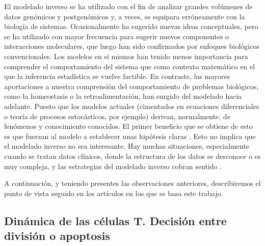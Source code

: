 El modelado inverso se ha utilizado con el fin de analizar grandes volúmenes de datos genómicos y postgenómicos y, a veces, se equipara erróneamente con la biología de sistemas. Ocasionalmente ha sugerido nuevas ideas conceptuales, pero se ha utilizado con mayor frecuencia para sugerir nuevos componentes o interacciones moleculares, que luego han sido confirmados por enfoques biológicos convencionales. Los modelos en sí mismos han tenido menos importancia para comprender el comportamiento del sistema que como contexto matemático en el que la inferencia estadística se vuelve factible. En contraste, las mayores aportaciones a nuestra comprensión del comportamiento de problemas biológicos, como la homeostasis o la retroalimentación, han surgido del modelado hacia adelante. Puesto que los modelos actuales (cimentados en ecuaciones diferenciales o teoría de procesos estocásticos, por ejemplo) derivan, normalmente, de fenómenos y conocimiento conocidos. El primer beneficio que se obtiene de esto es que fuerzan al modelo a establecer unas hipótesis claras \citep{mathsModInmu}. Esto no implica que el modelado inverso no sea interesante. Hay muchas situaciones, especialmente cuando se tratan datos clínicos, donde la estructura de los datos se desconoce o es muy compleja, y las estrategias del modelado inverso cobran sentido \citep{Gunawardena2014}. 


A continuación, y teniendo presentes las observaciones anteriores, describiremos el punto de vista seguido en los artículos en los que se basa este trabajo.


\subsection{Dinámica de las células T. Decisión entre división o apoptosis}
\label{cuestionAmodelizar}

